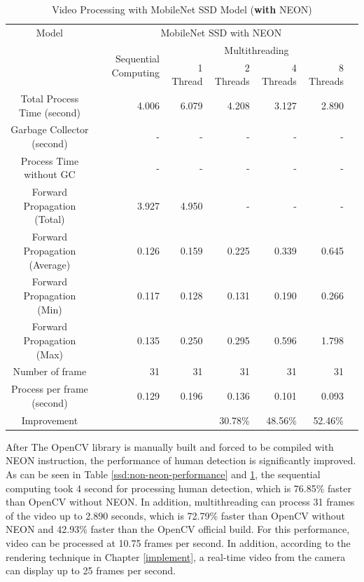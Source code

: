             \begin{table}[!htp]\centering
                \scriptsize
                \begin{tabular}{lrrrrrrr}\toprule
                    \multicolumn{2}{c}{Model} &\multicolumn{5}{c}{MobileNet SSD with NEON} \\\cmidrule{1-7}
                    \multicolumn{2}{c}{\multirow{2}{*}{}} &\multirow{2}{*}{Sequential Computing} &\multicolumn{4}{c}{Multithreading} \\\cmidrule{4-7}
                    & & &1 Thread &2 Threads &4 Threads &8 Threads \\\midrule
                    \multicolumn{2}{c}{Total Process Time (second)} &4.006 &6.079 &4.208 &3.127 &2.890 \\
                    \multicolumn{2}{c}{Garbage Collector (second)} &- &- &- &- &- \\
                    \multicolumn{2}{c}{Process Time without GC} &- &- &- &- &- \\
                    \multicolumn{2}{c}{Forward Propagation (Total)} &3.927 &4.950 &- &- &- \\
                    \multicolumn{2}{c}{Forward Propagation (Average)} &0.126 &0.159 &0.225 &0.339 &0.645 \\
                    \multicolumn{2}{c}{Forward Propagation (Min)} &0.117 &0.128 &0.131 &0.190 &0.266 \\
                    \multicolumn{2}{c}{Forward Propagation (Max)} &0.135 &0.250 &0.295 &0.596 &1.798 \\
                    \multicolumn{2}{c}{Number of frame} &31 &31 &31 &31 &31 \\
                    \multicolumn{2}{c}{Process per frame (second)} &0.129 &0.196 &0.136 &0.101 &0.093 \\
                    \multicolumn{2}{c}{Improvement} & & &30.78\% &48.56\% &52.46\% \\
                    \bottomrule
                \end{tabular}

                \caption{Video Processing with MobileNet SSD Model ({\bf with} NEON)}\label{ssd:neon-performance}
            \end{table}

            After The OpenCV library is manually built and forced to be compiled with NEON instruction,
            the performance of human detection is significantly improved.
            As can be seen in Table \ref{ssd:non-neon-performance} and \ref{ssd:neon-performance},
            the sequential computing took 4 second for processing human detection,
            which is 76.85\% faster than OpenCV without NEON.
            In addition, multithreading can process 31 frames of the video up to 2.890 seconds,
            which is 72.79\% faster than OpenCV without NEON and 42.93\% faster than the OpenCV official build.
            For this performance, video can be processed at 10.75 frames per second.
            In addition, according to the rendering technique in Chapter \ref{implement},
            a real-time video from the camera can display up to 25 frames per second.

